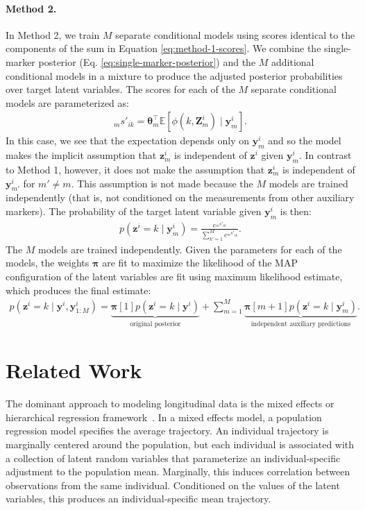 \documentclass[12pt]{article}
\newcommand{\T}{\top}
\newcommand{\E}{\mathbb{E}}
\newcommand{\given}{\mid}
\begin{document}
\paragraph{Method 2.}
In Method 2, we train $M$ separate conditional models using scores identical to the components of the sum in Equation \ref{eq:method-1-scores}. We combine the single-marker posterior (Eq. \ref{eq:single-marker-posterior}) and the $M$ additional conditional models in a mixture to produce the adjusted posterior probabilities over target latent variables. The scores for each of the $M$ separate conditional models are parameterized as:
\begin{align}
_m s'_{ik} = \bm{\theta}_m^\T \E[ \phi(k, \bm{Z}^i_m) \given \bm{y}^i_m ].
\end{align}
In this case, we see that the expectation depends only on $\bm{y}^i_m$ and so the model makes the implicit assumption that $\bm{z}^i_m$ is independent of $\bm{z}^i$ given $\bm{y}^i_m$. In contrast to Method 1, however, it does not make the assumption that $\bm{z}^i_m$ is independent of $\bm{y}^i_{m'}$ for $m' \neq m$. This assumption is not made because the $M$ models are trained independently (that is, not conditioned on the measurements from other auxiliary markers). The probability of the target latent variable given $\bm{y}^i_m$ is then:
\begin{align}
p(\bm{z}^i = k \given \bm{y}^i_m) = \frac{e^{_m s'_{ik}}}{\sum_{k'=1}^M e^{_m s'_{ik}}}.
\end{align}
The $M$ models are trained independently. Given the parameters for each of the models, the weights $\bm{\pi}$ are fit to maximize the likelihood of the MAP configuration of the latent variables are fit using maximum likelihood estimate, which produces the final estimate:
\begin{align}
p( \bm{z}^i = k \given \bm{y}^i, \bm{y}^i_{1:M} ) =
	\underbrace{\bm{\pi}[1] p(\bm{z}^i = k \given \bm{y}^i)}_{\text{original posterior}} +
	\sum_{m=1}^M
		\underbrace{\bm{\pi}[m + 1] p( \bm{z}^i = k \given \bm{y}^i_m )}_{\text{independent auxiliary predictions}}.
\end{align}

\section{Related Work}

The dominant approach to modeling longitudinal data is the mixed effects or hierarchical regression framework~\cite{Diggle2002-tt}. In a mixed effects model, a population regression model specifies the average trajectory. An individual trajectory is marginally centered around the population, but each individual is associated with a collection of latent random variables that parameterize an individual-specific adjustment to the population mean. Marginally, this induces correlation between observations from the same individual. Conditioned on the values of the latent variables, this produces an individual-specific mean trajectory.
\end{document}
